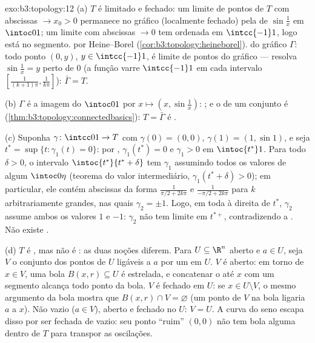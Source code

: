 \begin{solution}{exo:b3:topology:12}
(a) $T$ é limitado e fechado: um limite de pontos de $T$
com abscissas $\to x_0 > 0$ permanece no gráfico (localmente fechado)
pela  de $\sin\frac1x$ em $\intoc01$; um limite
com abscissas $\to 0$ tem ordenada em $\intcc{-1}1$, logo
está no segmento.  por Heine--Borel
(\cref{cor:b3:topology:heineborel}).  do gráfico
$\Gamma$: todo ponto $(0, y)$, $y \in \intcc{-1}1$, é
limite de pontos do gráfico --- resolva $\sin\frac1x = y$ perto de $0$
(a função varre $\intcc{-1}1$ em cada intervalo
$[\frac1{(k+1)\pi}, \frac1{k\pi}]$): $\bar\Gamma = T$.

(b) $\Gamma$ é a imagem  do 
$\intoc01$ por $x \mapsto (x, \sin\frac1x)$: ;
e o  de um conjunto  é 
(\cref{thm:b3:topology:connectedbasics}): $T = \bar\Gamma$
é .

(c) Suponha $\gamma\colon\intcc01\to T$  com
$\gamma(0) = (0,0)$, $\gamma(1) = (1, \sin1)$, e seja $t^*
= \sup\{t : \gamma_1(t) = 0\}$: por , $\gamma_1(t^*)
= 0$ e $\gamma_1 > 0$ em $\intoc{t^*}1$. Para todo
$\delta > 0$, o intervalo $\intoc{t^*}{t^*+\delta}$ tem
$\gamma_1$ assumindo todos os valores de algum $\intoc0\eta$
(teorema do valor intermediário, $\gamma_1(t^* + \delta) > 0$);
em particular, ele contém abscissas da forma
$\frac1{\pi/2 + 2k\pi}$ e $\frac1{-\pi/2 + 2k\pi}$ para
$k$ arbitrariamente grandes, nas quais $\gamma_2 = \pm1$. Logo, em
toda  à direita de $t^*$, $\gamma_2$ assume ambos os
valores $1$ e $-1$: $\gamma_2$ não tem limite em $t^{*+}$,
contradizendo a . Não existe .

(d) $T$ é , mas não é : as duas noções
diferem. Para $U \subseteq \R^n$ aberto  e $a \in U$,
seja $V$ o conjunto dos pontos de $U$ ligáveis a $a$ por um
 em $U$. $V$ é aberto: em torno de $x \in V$, uma bola $B(x, r)
\subseteq U$ é estrelada, e concatenar o  até $x$
com um segmento alcança todo ponto da bola. $V$ é
fechado em $U$: se $x \in U \setminus V$, o mesmo argumento da bola
mostra que $B(x, r) \cap V = \varnothing$ (um ponto de
$V$ na bola ligaria $a$ a $x$). Não vazio ($a \in
V$), aberto e fechado no  $U$: $V = U$. A curva
do seno escapa disso por ser fechada de  vazio: seu
ponto ``ruim'' $(0,0)$ não tem bola alguma dentro de $T$ para
transpor as oscilações.
\end{solution}

